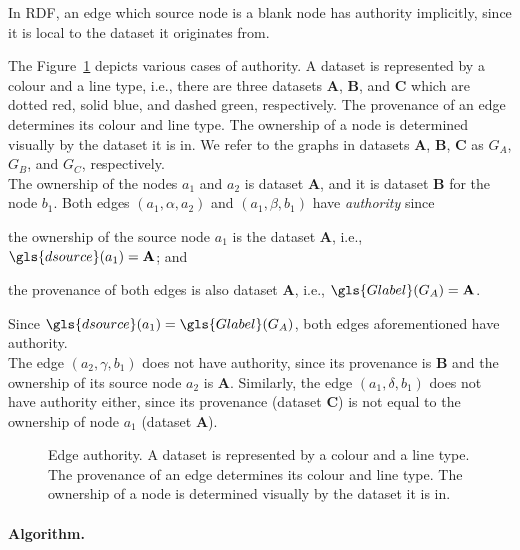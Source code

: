 \begin{remark}
	In RDF, an edge which source node is a blank node has authority implicitly, since it is local to the dataset it originates from.
\end{remark}

The Figure~\ref{fig:authority} depicts various cases of authority. A dataset is represented by a colour and a line type, i.e., there are three datasets {\bfseries A}, {\bfseries B}, and {\bfseries C} which are dotted red, solid blue, and dashed green, respectively. The provenance of an edge determines its colour and line type. The ownership of a node is determined visually by the dataset it is in. We refer to the graphs in datasets \textbf{A}, \textbf{B}, \textbf{C} as $G_A$, $G_B$, and $G_C$, respectively.\\

The ownership of the nodes $a_1$ and $a_2$ is dataset {\bfseries A}, and it is dataset {\bfseries B} for the node $b_1$. Both edges $(a_1, \alpha, a_2)$ and $\left(a_1, \beta, b_1 \right)$ have \emph{authority} since
\begin{inparaenum}[(1)]
	\item the ownership of the source node $a_1$ is the dataset {\bfseries A}, i.e., $\gls{dsource}(a_1) = \textbf{A}$; and
	\item the provenance of both edges is also dataset {\bfseries A}, i.e., $\gls{Glabel}(G_A) = \textbf{A}$.
\end{inparaenum}
Since $\gls{dsource}(a_1) = \gls{Glabel}(G_A)$, both edges aforementioned have authority.\\

The edge $\left(a_2, \gamma, b_1\right)$ does not have authority, since its provenance is {\bfseries B} and the ownership of its source node $a_2$ is {\bfseries A}. Similarly, the edge $\left(a_1,\delta,b_1\right)$ does not have authority either, since its provenance (dataset \textbf{C}) is not equal to the ownership of node $a_1$ (dataset \textbf{A}).

\begin{figure}
	\centering
	
	\caption{Edge authority. A dataset is represented by a colour and a line type. The provenance of an edge determines its colour and line type. The ownership of a node is determined visually by the dataset it is in.}
	\label{fig:authority}
\end{figure}

\paragraph{Algorithm.}

